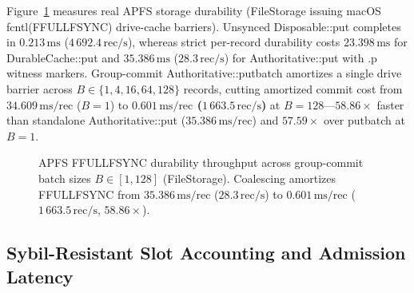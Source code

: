 \documentclass[journal]{IEEEtran}
\DeclareRobustCommand{\code}[1]{{\ttfamily\renewcommand{\_}{\textunderscore\allowbreak}#1}}
\begin{document}
Figure~\ref{fig:group-commit} measures real APFS storage durability (\code{FileStorage} issuing macOS \code{fcntl(F\_FULLFSYNC)} drive-cache barriers). Unsynced \code{Disposable::put} completes in $0.213\,\text{ms}$ ($4\,692.4\,\text{rec/s}$), whereas strict per-record durability costs $23.398\,\text{ms}$ for \code{DurableCache::put} and $35.386\,\text{ms}$ ($28.3\,\text{rec/s}$) for \code{Authoritative::put} with \code{.p} witness markers. Group-commit \code{Authoritative::put\_batch} amortizes a single drive barrier across $B\in\{1,4,16,64,128\}$ records, cutting amortized commit cost from $34.609\,\text{ms/rec}$ ($B=1$) to \textbf{$0.601\,\text{ms/rec}$ ($1\,663.5\,\text{rec/s}$)} at $B=128$---\textbf{$58.86\times$} faster than standalone \code{Authoritative::put} ($35.386\,\text{ms/rec}$) and \textbf{$57.59\times$} over \code{put\_batch} at $B=1$.

\begin{figure}[t]
\centering
{}
\caption{APFS \code{F\_FULLFSYNC} durability throughput across group-commit batch sizes $B\in[1,128]$ (\code{FileStorage}). Coalescing amortizes \code{F\_FULLFSYNC} from $35.386\,\text{ms/rec}$ ($28.3\,\text{rec/s}$) to $0.601\,\text{ms/rec}$ ($1\,663.5\,\text{rec/s}$, $58.86\times$).}
\label{fig:group-commit}
\end{figure}

\subsection{Sybil-Resistant Slot Accounting and Admission Latency}
\end{document}
